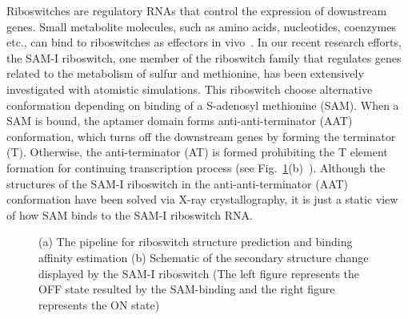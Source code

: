 \documentclass[a4paper,10pt]{article}
\newcommand{\up}{\vspace*{-1em}}
\begin{document}
Riboswitches are regulatory RNAs that control the expression of downstream genes. Small metabolite molecules, such as amino acids, nucleotides, coenzymes etc., can bind to riboswitches as effectors in vivo~\cite{mandal}.  In our recent research efforts, the SAM-I riboswitch, one member of the riboswitch family that regulates genes related to the metabolism of sulfur and methionine, has been extensively investigated with atomistic simulations.  This riboswitch choose alternative conformation depending on binding of a S-adenosyl methionine (SAM).  When a SAM is bound, the aptamer domain forms anti-anti-terminator (AAT) conformation, which turns off the downstream genes by forming the terminator (T). Otherwise, the anti-terminator (AT) is formed prohibiting the T element formation for continuing transcription process (see Fig.~\ref{fig:ribo-pipeline}(b)~\cite{brooke}).  Although the structures of the SAM-I riboswitch in the anti-anti-terminator (AAT) conformation have been solved via X-ray crystallography, it is just a static view of how SAM binds to the SAM-I riboswitch RNA.

\begin{figure}
\begin{center}
\end{center}
\up\up
\caption{(a) The pipeline for riboswitch structure prediction and binding affinity estimation (b) Schematic of the secondary structure change displayed by the SAM-I riboswitch (The left figure represents the OFF state resulted by the SAM-binding and the right figure represents the ON state)}
\label{fig:ribo-pipeline}
\up
\end{figure}
\end{document}
